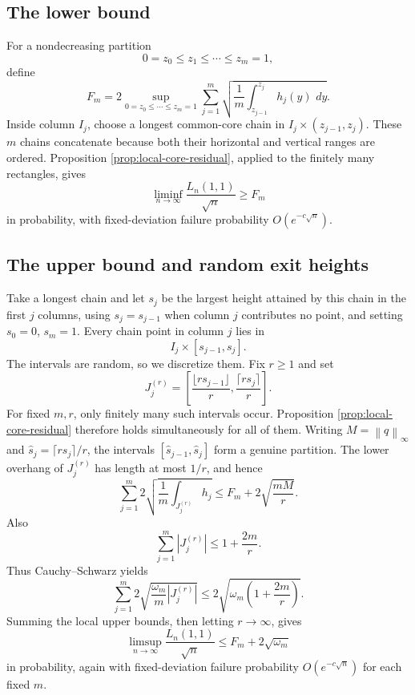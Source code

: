 \documentclass[11pt]{article}
\theoremstyle{remark}
\newcommand{\dd}{\,d}
\newcommand{\norm}[1]{\left\lVert #1\right\rVert}
\begin{document}
\subsection{The lower bound}

For a nondecreasing partition
\[
        0=z_0\le z_1\le\cdots\le z_m=1,
\]
define
\begin{equation}\label{eq:Fm-def}
 F_m=2\sup_{0=z_0\le\cdots\le z_m=1}
 \sum_{j=1}^m
 \sqrt{\frac1m\int_{z_{j-1}}^{z_j}h_j(y)\,\dd y}.
\end{equation}
Inside column $I_j$, choose a longest common-core chain in
$I_j\times(z_{j-1},z_j)$.  These $m$ chains concatenate because both their
horizontal and vertical ranges are ordered.  Proposition
\ref{prop:local-core-residual}, applied to the finitely many rectangles, gives
\begin{equation}\label{eq:global-liminf}
        \liminf_{n\to\infty}\frac{L_n(1,1)}{\sqrt n}
        \ge F_m
\end{equation}
in probability, with fixed-deviation failure probability $O(e^{-c\sqrt n})$.

\subsection{The upper bound and random exit heights}

Take a longest chain and let $s_j$ be the largest height attained by this
chain in the first $j$ columns, using $s_j=s_{j-1}$ when column $j$ contributes
no point, and setting $s_0=0$, $s_m=1$.  Every chain point in column $j$ lies
in
\[
        I_j\times[s_{j-1},s_j].
\]
The intervals are random, so we discretize them.  Fix $r\ge1$ and set
\[
 J_j^{(r)}=
 \left[\frac{\lfloor rs_{j-1}\rfloor}{r},
       \frac{\lceil rs_j\rceil}{r}\right].
\]
For fixed $m,r$, only finitely many such intervals occur.  Proposition
\ref{prop:local-core-residual} therefore holds simultaneously for all of them.
Writing $M=\norm q_\infty$ and
$\widehat s_j=\lceil rs_j\rceil/r$, the intervals
$[\widehat s_{j-1},\widehat s_j]$ form a genuine partition.  The lower
overhang of $J_j^{(r)}$ has length at most $1/r$, and hence
\begin{equation}\label{eq:core-mesh-bound}
 \sum_{j=1}^m
 2\sqrt{\frac1m\int_{J_j^{(r)}}h_j}
 \le F_m+2\sqrt{\frac{mM}{r}}.
\end{equation}
Also
\[
        \sum_{j=1}^m|J_j^{(r)}|
        \le1+\frac{2m}{r}.
\]
Thus Cauchy--Schwarz yields
\begin{equation}\label{eq:residual-mesh-bound}
 \sum_{j=1}^m
 2\sqrt{\frac{\omega_m}{m}|J_j^{(r)}|}
 \le2\sqrt{\omega_m\left(1+\frac{2m}{r}\right)}.
\end{equation}
Summing the local upper bounds, then letting $r\to\infty$, gives
\begin{equation}\label{eq:global-limsup}
        \limsup_{n\to\infty}\frac{L_n(1,1)}{\sqrt n}
        \le F_m+2\sqrt{\omega_m}
\end{equation}
in probability, again with fixed-deviation failure probability
$O(e^{-c\sqrt n})$ for each fixed $m$.
\end{document}
